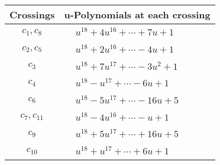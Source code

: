 \documentclass[1p]{elsarticle_modified}
\theoremstyle{definition}
\begin{document}
\begin{tabular}{m{50pt}|m{274pt}}
Crossings & \hspace{64pt}u-Polynomials at each crossing \\
\hline $$\begin{aligned}c_{1},c_{8}\end{aligned}$$&$\begin{aligned}
&u^{18}+4 u^{16}+\cdots+7 u+1
\end{aligned}$\\
\hline $$\begin{aligned}c_{2},c_{5}\end{aligned}$$&$\begin{aligned}
&u^{18}+2 u^{16}+\cdots-4 u+1
\end{aligned}$\\
\hline $$\begin{aligned}c_{3}\end{aligned}$$&$\begin{aligned}
&u^{18}+7 u^{17}+\cdots-3 u^2+1
\end{aligned}$\\
\hline $$\begin{aligned}c_{4}\end{aligned}$$&$\begin{aligned}
&u^{18}- u^{17}+\cdots-6 u+1
\end{aligned}$\\
\hline $$\begin{aligned}c_{6}\end{aligned}$$&$\begin{aligned}
&u^{18}-5 u^{17}+\cdots-16 u+5
\end{aligned}$\\
\hline $$\begin{aligned}c_{7},c_{11}\end{aligned}$$&$\begin{aligned}
&u^{18}-4 u^{16}+\cdots- u+1
\end{aligned}$\\
\hline $$\begin{aligned}c_{9}\end{aligned}$$&$\begin{aligned}
&u^{18}+5 u^{17}+\cdots+16 u+5
\end{aligned}$\\
\hline $$\begin{aligned}c_{10}\end{aligned}$$&$\begin{aligned}
&u^{18}+u^{17}+\cdots+6 u+1
\end{aligned}$\\
\hline
\end{tabular}\\~\\
\end{document}
